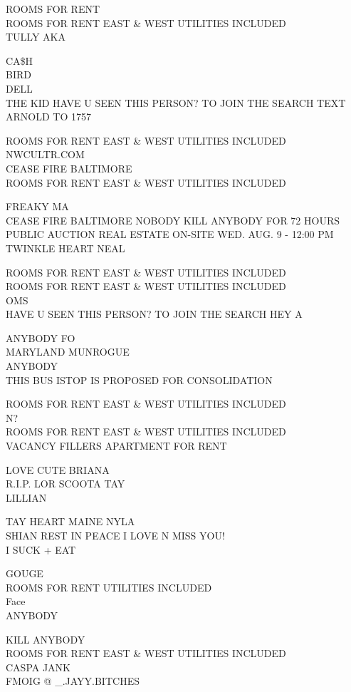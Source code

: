 \documentclass[10pt,letterpaper]{article}
\begin{document}
ROOMS FOR RENT\\
ROOMS FOR RENT EAST \& WEST UTILITIES INCLUDED\\
TULLY AKA

CA\$H\\
BIRD\\
DELL\\
THE KID HAVE U SEEN THIS PERSON?  TO JOIN THE SEARCH TEXT ARNOLD TO 1757

ROOMS FOR RENT EAST \& WEST UTILITIES INCLUDED\\
NWCULTR.COM\\
CEASE FIRE BALTIMORE\\
ROOMS FOR RENT EAST \& WEST UTILITIES INCLUDED

FREAKY MA\\
CEASE FIRE BALTIMORE NOBODY KILL ANYBODY FOR 72 HOURS\\
PUBLIC AUCTION REAL ESTATE ON{-}SITE WED. AUG. 9 {-} 12:00 PM\\
TWINKLE HEART NEAL

ROOMS FOR RENT EAST \& WEST UTILITIES INCLUDED\\
ROOMS FOR RENT EAST \& WEST UTILITIES INCLUDED\\
OMS\\
HAVE U SEEN THIS PERSON?  TO JOIN THE SEARCH HEY A

ANYBODY FO\\
MARYLAND MUNROGUE\\
ANYBODY\\
THIS BUS ISTOP IS PROPOSED FOR CONSOLIDATION

ROOMS FOR RENT EAST \& WEST UTILITIES INCLUDED\\
N?\\
ROOMS FOR RENT EAST \& WEST UTILITIES INCLUDED\\
VACANCY FILLERS APARTMENT FOR RENT

LOVE CUTE BRIANA\\
R.I.P. LOR SCOOTA TAY\\
LILLIAN

TAY HEART MAINE NYLA\\
SHIAN REST IN PEACE I LOVE N MISS YOU!\\
I SUCK + EAT

GOUGE\\
ROOMS FOR RENT UTILITIES INCLUDED\\
Face\\
ANYBODY

KILL ANYBODY\\
ROOMS FOR RENT EAST \& WEST UTILITIES INCLUDED\\
CASPA JANK\\
FMOIG @ \_.JAYY.BITCHES
\end{document}

